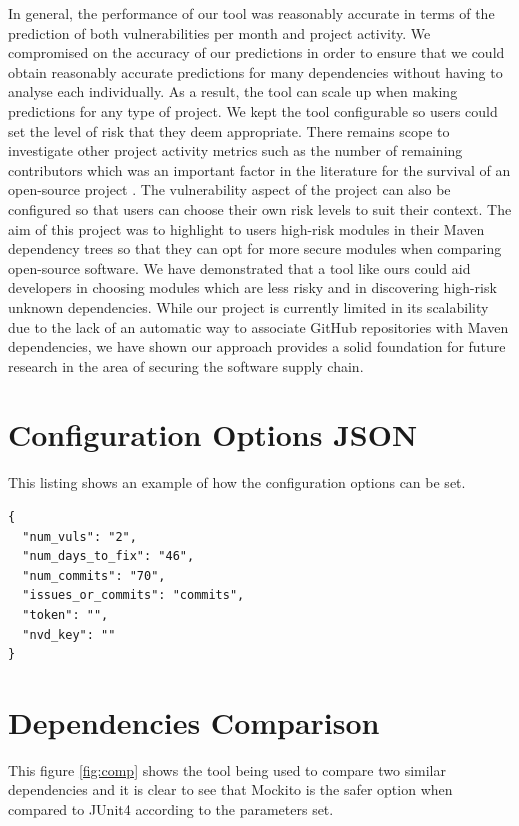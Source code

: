\documentclass[conference]{IEEEtran}
\begin{document}
In general, the performance of our tool was reasonably accurate in terms of the prediction of both vulnerabilities per month and project activity. We compromised on the accuracy of our predictions in order to ensure that we could obtain reasonably accurate predictions for many dependencies without having to analyse each individually. As a result, the tool can scale up when making predictions for any type of project. We kept the tool configurable so users could set the level of risk that they deem appropriate. There remains scope to investigate other project activity metrics such as the number of remaining contributors which was an important factor in the literature for the survival of an open-source project \cite{l_bao_large_2021}. The vulnerability aspect of the project can also be configured so that users can choose their own risk levels to suit their context. The aim of this project was to highlight to users high-risk modules in their Maven dependency trees so that they can opt for more secure modules when comparing open-source software. We have demonstrated that a tool like ours could aid developers in choosing modules which are less risky and in discovering high-risk unknown dependencies. While our project is currently limited in its scalability due to the lack of an automatic way to associate GitHub repositories with Maven dependencies, we have shown our approach provides a solid foundation for future research in the area of securing the software supply chain. 



\onecolumn
\appendices

\section{Configuration Options JSON}
This listing shows an example of how the configuration options can be set. 

\begin{lstlisting}[caption=Configuration Options]
{
  "num_vuls": "2",
  "num_days_to_fix": "46",
  "num_commits": "70",
  "issues_or_commits": "commits",
  "token": "",
  "nvd_key": ""
}
\end{lstlisting}

\section{Dependencies Comparison}
This figure \ref{fig:comp} shows the tool being used to compare two similar dependencies and it is clear to see that Mockito is the safer option when compared to JUnit4 according to the parameters set. 
\end{document}
